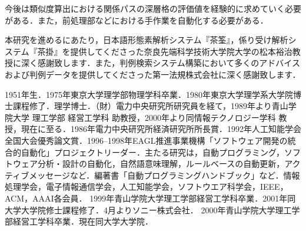今後は類似度算出における関係パスの深層格の評価値を経験的に求めていく必要がある．また，前処理部などにおける手作業を自動化する必要がある．

\acknowledgment

本研究を進めるにあたり，日本語形態素解析システム『茶筌』，係り受け解析システム『茶掛』を提供してくださった奈良先端科学技術大学院大学の松本裕治教授に深く感謝致します．また，判例検索システム構築において多くのアドバイスおよび判例データを提供してくださった第一法規株式会社に深く感謝致します．




\begin{biography}
{1951年生．1975年東京大学理学部物理学科卒業．1980年東京大学理学系大学院博士課程修了．理学博士．（財）電力中央研究所研究員を経て，1989年より青山学院大学 理工学部 経営工学科 助教授，2000年より同情報テクノロジー学科 教授，現在に至る．1986年電力中央研究所経済研究所所長賞．1992年人工知能学会全国大会優秀論文賞．1996--1998年EAGL推進事業機構「ソフトウェア開発の統合的自動化」プロジェクトリーダー．主たる研究は，自動プログラミング，ソフトウェア分析・設計の自動化，自然語意味理解，ルールベースの自動更新，アクティブメッセージなど．編著書「自動プログラミングハンドブック」など．情報処理学会，電子情報通信学会，人工知能学会，ソフトウエア科学会，IEEE，ACM，AAAI各会員．}
{1999年青山学院大学理工学部経営工学科卒業．2001年同大学大学院修士課程修了．4月よりソニー株式会社．}
{2000年青山学院大学理工学部経営工学科卒業．現在同大学大学院．} 

\end{biography}


